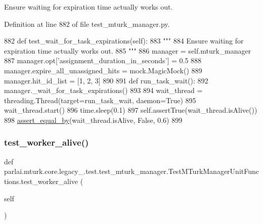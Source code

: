 \begin{DoxyVerb}Ensure waiting for expiration time actually works out.
\end{DoxyVerb}
 

Definition at line 882 of file test\+\_\+mturk\+\_\+manager.\+py.


\begin{DoxyCode}
882     \textcolor{keyword}{def }test\_wait\_for\_task\_expirations(self):
883         \textcolor{stringliteral}{"""}
884 \textcolor{stringliteral}{        Ensure waiting for expiration time actually works out.}
885 \textcolor{stringliteral}{        """}
886         manager = self.mturk\_manager
887         manager.opt[\textcolor{stringliteral}{'assignment\_duration\_in\_seconds'}] = 0.5
888         manager.expire\_all\_unassigned\_hits = mock.MagicMock()
889         manager.hit\_id\_list = [1, 2, 3]
890 
891         \textcolor{keyword}{def }run\_task\_wait():
892             manager.\_wait\_for\_task\_expirations()
893 
894         wait\_thread = threading.Thread(target=run\_task\_wait, daemon=\textcolor{keyword}{True})
895         wait\_thread.start()
896         time.sleep(0.1)
897         self.assertTrue(wait\_thread.isAlive())
898         \hyperlink{namespaceparlai_1_1mturk_1_1core_1_1test_1_1test__mturk__manager_a1fd7ac4fedefa65d2416601107dbe44c}{assert\_equal\_by}(wait\_thread.isAlive, \textcolor{keyword}{False}, 0.6)
899 
\end{DoxyCode}
\mbox{\label{classparlai_1_1mturk_1_1core_1_1legacy__2018_1_1test_1_1test__mturk__manager_1_1TestMTurkManagerUnitFunctions_a28bad94b8e18c685b5eb66da3d8b9338}} 
\subsubsection{\texorpdfstring{test\+\_\+worker\+\_\+alive()}{test\_worker\_alive()}}
{\footnotesize\ttfamily def parlai.\+mturk.\+core.\+legacy\+\_.\+test.\+test\+\_\+mturk\+\_\+manager.\+Test\+M\+Turk\+Manager\+Unit\+Functions.\+test\+\_\+worker\+\_\+alive (\begin{DoxyParamCaption}\item[{}]{self }\end{DoxyParamCaption})}



